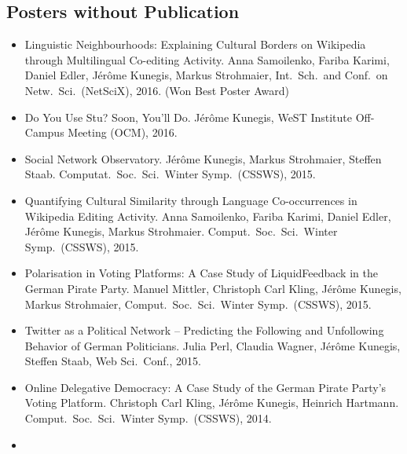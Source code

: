 \documentclass[line,mm]{res}
\newcounter{x}
\newcounter{y}
\newcounter{z}
\begin{document}
\begin{resume}
\section{Posters without Publication}
\begin{itemize}
  \item[{[P1]}] 
    Linguistic Neighbourhoods:  Explaining Cultural Borders on
    Wikipedia through Multilingual Co-editing Activity.  Anna
    Samoilenko, Fariba Karimi, Daniel Edler, Jérôme Kunegis, Markus
    Strohmaier, Int.\ Sch.\ and Conf.\ on Netw.\ Sci.\ (NetSciX),
    2016.  (Won Best Poster Award)
  \item[{[P2]}]
    Do You Use Stu? Soon, You'll Do.
    Jérôme Kunegis, 
    WeST Institute Off-Campus Meeting (OCM), 2016. 
  \item[{[P3]}]
    Social Network Observatory.  Jérôme Kunegis, Markus Strohmaier,
    Steffen Staab.  Computat.\ Soc.\ Sci.\ Winter Symp.\ (CSSWS), 2015.
  \item[{[P4]}] 
    Quantifying Cultural Similarity through Language Co-occurrences
    in Wikipedia Editing Activity. Anna Samoilenko, Fariba Karimi,
    Daniel Edler, Jérôme Kunegis, Markus Strohmaier.  Comput.\ Soc.\ Sci.\ Winter Symp.\ (CSSWS), 2015.
  \item[{[P5]}] 
    Polarisation in Voting Platforms: A Case Study of LiquidFeedback
    in the German Pirate Party. Manuel Mittler, Christoph Carl Kling,
    Jérôme Kunegis, Markus Strohmaier, Comput.\ Soc.\ Sci.\ Winter Symp.\ (CSSWS), 2015.
  \item[{[P6]}]
    Twitter as a Political Network -- Predicting the Following and
    Unfollowing Behavior of {German} Politicians. Julia Perl, Claudia
    Wagner, Jérôme Kunegis, Steffen Staab, Web Sci.\ Conf., 2015. 
  \item[{[P7]}] 
    Online Delegative Democracy: A Case Study of the German Pirate
    Party's Voting Platform.  Christoph Carl Kling, Jérôme Kunegis,
    Heinrich Hartmann.  Comput.\ Soc.\ Sci.\ Winter
    Symp.\ (CSSWS), 2014.
  \item[{[P8]}]

\end{itemize}
\end{resume}
\end{document}
